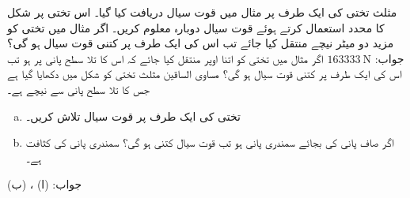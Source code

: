 مثلث تختی کی ایک طرف پر مثال  میں قوت سیال دریافت کیا گیا۔ اس تختی پر شکل  کا محدد استعمال کرتے ہوئے قوت سیال دوبارہ معلوم کریں۔ 
اگر مثال  میں تختی کو مزید دو میٹر نیچے منتقل کیا جائے تب اس کی ایک طرف پر کتنی قوت سیال ہو گی؟\\
جواب:\quad
$\SI{163333}{\newton}$
اگر مثال  میں تختی کو اتنا اوپر منتقل کیا جائے کہ اس کا تلا سطح پانی پر ہو تب اس کی ایک طرف پر کتنی قوت سیال ہو گی؟
مساوی الساقین مثلث تختی کو شکل  میں دکھایا گیا ہے جس کا تلا سطح پانی سے  نیچے ہے۔
\begin{enumerate}[a.]
\item
تختی کی ایک طرف پر قوت سیال تلاش کریں۔
\item
اگر صاف پانی کی بجائے سمندری پانی ہو تب قوت سیال کتنی ہو گی؟ سمندری پانی کی کثافت  ہے۔ 
\end{enumerate}
جواب:\quad
(ا) ، (ب) 
